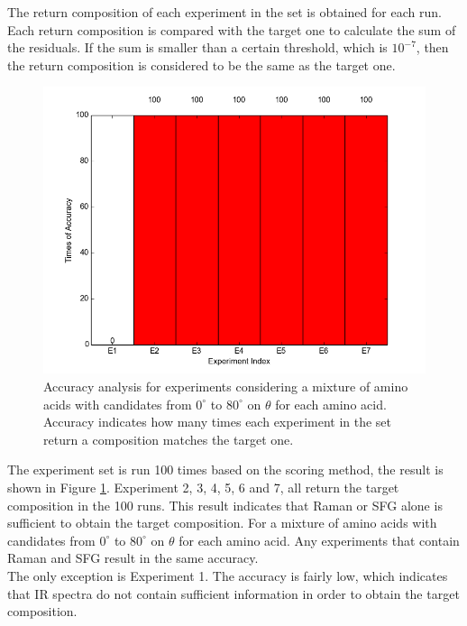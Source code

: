 The return composition of each experiment in the set is obtained for each run. Each return composition is compared with the target one to calculate the sum of the residuals. If the sum is smaller than a certain threshold, which is $10^{-7}$, then the return composition is considered to be the same as the target one. \\

\begin{figure}[!ht]
\centering
\includegraphics[scale=0.7]{Figures/accuracy_pecent_result8_mixture.png}
\caption{Accuracy analysis for experiments considering a mixture of amino acids with candidates from $0^{\circ}$ to $80^{\circ}$ on $\theta$ for each amino acid. Accuracy indicates how many times each experiment in the set return a composition matches the target one.}  \label{fig:5.1}
\end{figure}

The experiment set is run 100 times based on the scoring method, the result is shown in 
Figure \ref{fig:5.1}. Experiment 2, 3, 4, 5, 6 and 7, all return the target composition in the 100 runs. This result indicates that Raman or SFG alone is sufficient to obtain the target composition. For a mixture of amino acids with candidates from $0^{\circ}$ to $80^{\circ}$ on $\theta$ for each amino acid. Any experiments that contain Raman and SFG result in the same accuracy. \\

The only exception is Experiment 1. The accuracy is fairly low, which indicates that IR spectra do not contain sufficient information in order to obtain the target composition. \\

